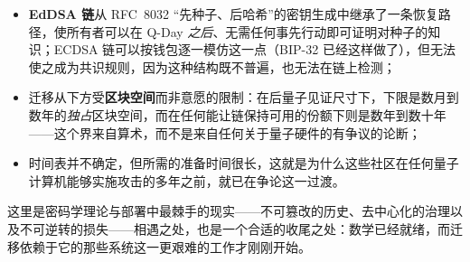 \begin{itemize}
  \item \textbf{EdDSA 链}从 RFC~8032 “先种子、后哈希”的密钥生成中继承了一条恢复路径，使所有者可以在 Q-Day \emph{之后}、无需任何事先行动即可证明对种子的知识；ECDSA 链可以按钱包逐一模仿这一点（BIP-32 已经这样做了），但无法使之成为共识规则，因为这种结构既不普遍，也无法在链上检测；
  \item 迁移从下方受\textbf{区块空间}而非意愿的限制：在后量子见证尺寸下，下限是数月到数年的\emph{独占}区块空间，而在任何能让链保持可用的份额下则是数年到数十年——这个界来自算术，而不是来自任何关于量子硬件的有争议的论断；
  \item 时间表并不确定，但所需的准备时间很长，这就是为什么这些社区在任何量子计算机能够实施攻击的多年之前，就已在争论这一过渡。
\end{itemize}

这里是密码学理论与部署中最棘手的现实——不可篡改的历史、去中心化的治理以及不可逆转的损失——相遇之处，也是一个合适的收尾之处：数学已经就绪，而迁移依赖于它的那些系统这一更艰难的工作才刚刚开始。

\printbibliography[heading=chapterrefs]
